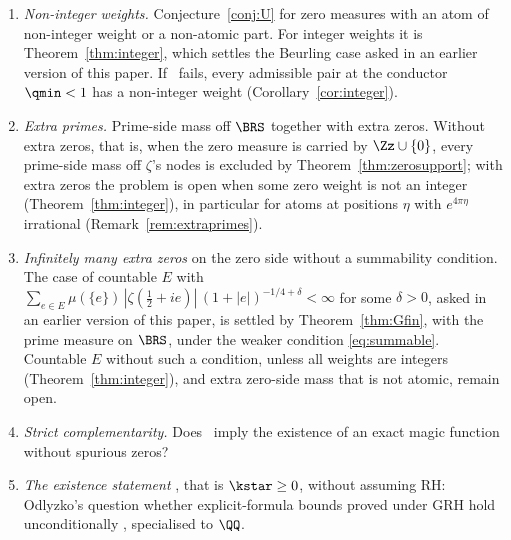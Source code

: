 \begin{enumerate}[label=\textup{(\arabic*)}]
\item\label{op:fractional} \emph{Non-integer weights.} Conjecture~\ref{conj:U} for zero measures with an atom of non-integer weight or a
non-atomic part. For integer weights it is Theorem~\ref{thm:integer}, which settles the Beurling case asked in an earlier version of this
paper. If \condS\ fails, every admissible pair at the conductor $\qmin<1$ has a non-integer weight (Corollary~\ref{cor:integer}).
\item \emph{Extra primes.} Prime-side mass off $\BRS$ together with extra zeros. Without extra zeros, that is, when the zero measure is
carried by $\Zz\cup\{0\}$, every prime-side mass off $\zeta$'s nodes is excluded by Theorem~\ref{thm:zerosupport}; with extra zeros the
problem is open when some zero weight is not an integer (Theorem~\ref{thm:integer}), in particular for atoms at positions $\eta$ with
$e^{4\pi\eta}$ irrational (Remark~\ref{rem:extraprimes}).
\item \emph{Infinitely many extra zeros} on the zero side without a summability condition. The case of countable $E$ with
$\sum_{e\in E}\mu(\{e\})\,|\zeta(\frac12+ie)|\,(1+|e|)^{-1/4+\delta}<\infty$ for some $\delta>0$, asked in an earlier version of this paper, is
settled by Theorem~\ref{thm:Gfin}, with the prime measure on $\BRS$, under the weaker condition \eqref{eq:summable}. Countable $E$ without such a
condition, unless all weights are integers (Theorem~\ref{thm:integer}), and extra zero-side mass that is not atomic, remain open.
\item\label{op:strict-compl} \emph{Strict complementarity.} Does \condU\ imply the existence of an exact magic function
without spurious zeros?
\item \emph{The existence statement} \condE, that is $\kstar\ge0$, without assuming RH: Odlyzko's question
whether explicit-formula bounds proved under GRH hold unconditionally \cite{Odl90}, specialised to $\QQ$.
\end{enumerate}
